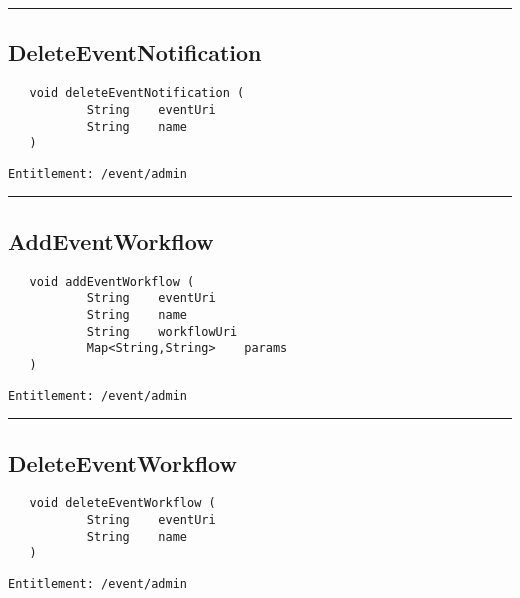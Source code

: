 \rule{12cm}{2pt}
\subsection{DeleteEventNotification}
\label{Api:DeleteEventNotification}
\begin{verbatim}
   void deleteEventNotification (
           String    eventUri
           String    name
   )
\end{verbatim}
\begin{Verbatim}[fontsize=\small, formatcom=\color{Maroon}]
  Entitlement: /event/admin
\end{Verbatim}



\rule{12cm}{2pt}
\subsection{AddEventWorkflow}
\label{Api:AddEventWorkflow}
\begin{verbatim}
   void addEventWorkflow (
           String    eventUri
           String    name
           String    workflowUri
           Map<String,String>    params
   )
\end{verbatim}
\begin{Verbatim}[fontsize=\small, formatcom=\color{Maroon}]
  Entitlement: /event/admin
\end{Verbatim}



\rule{12cm}{2pt}
\subsection{DeleteEventWorkflow}
\label{Api:DeleteEventWorkflow}
\begin{verbatim}
   void deleteEventWorkflow (
           String    eventUri
           String    name
   )
\end{verbatim}
\begin{Verbatim}[fontsize=\small, formatcom=\color{Maroon}]
  Entitlement: /event/admin
\end{Verbatim}



